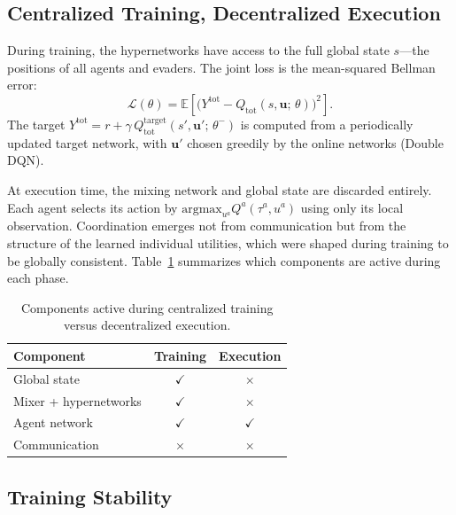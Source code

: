 \documentclass[sigconf,screen]{acmart}
\begin{document}
\subsection{Centralized Training, Decentralized Execution}

During training, the hypernetworks have access to the full global state $s$—the positions of all agents and evaders. The joint loss is the mean-squared Bellman error:
\begin{equation}
    \mathcal{L}(\theta) = \mathbb{E}\!\left[\bigl(Y^{\text{tot}} - Q_{\text{tot}}(s, \mathbf{u};\, \theta)\bigr)^2\right].
\end{equation}
The target $Y^{\text{tot}} = r + \gamma\, Q_{\text{tot}}^{\text{target}}(s', \mathbf{u}';\, \theta^-)$ is computed from a periodically updated target network, with $\mathbf{u}'$ chosen greedily by the online networks (Double DQN).

At execution time, the mixing network and global state are discarded entirely. Each agent selects its action by $\text{argmax}_{u^a} Q^a(\tau^a, u^a)$ using only its local observation. Coordination emerges not from communication but from the structure of the learned individual utilities, which were shaped during training to be globally consistent. Table~\ref{tab:ctde} summarizes which components are active during each phase.

\begin{table}[h]
  \centering
  \caption{Components active during centralized training versus decentralized execution.}
  \label{tab:ctde}
  \begin{tabular}{lcc}
    \toprule
    \textbf{Component}       & \textbf{Training}  & \textbf{Execution} \\
    \midrule
    Global state             & $\checkmark$       & $\times$           \\
    Mixer + hypernetworks    & $\checkmark$       & $\times$           \\
    Agent network            & $\checkmark$       & $\checkmark$       \\
    Communication            & $\times$           & $\times$           \\
    \bottomrule
  \end{tabular}
\end{table}

\subsection{Training Stability}
\end{document}
